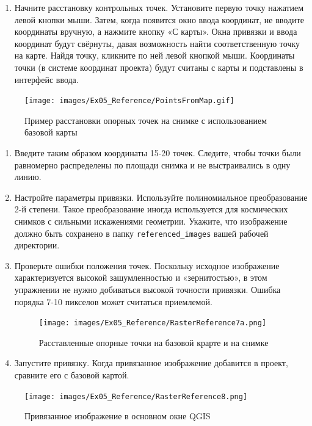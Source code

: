 \documentclass[
  12pt,
]{book}
\providecommand{\tightlist}{%
  \setlength{\itemsep}{0pt}\setlength{\parskip}{0pt}}
\begin{document}
\begin{enumerate}
\def\labelenumi{\arabic{enumi}.}
\setcounter{enumi}{5}
\tightlist
\item
  Начните расстановку контрольных точек. Установите первую точку нажатием левой кнопки мыши. Затем, когда появится окно ввода координат, не вводите координаты вручную, а нажмите кнопку «С карты». Окна привязки и ввода координат будут свёрнуты, давая возможность найти соответственную точку на карте. Найдя точку, кликните по ней левой кнопкой мыши. Координаты точки (в системе координат проекта) будут считаны с карты и подставлены в интерфейс ввода.
\end{enumerate}

\begin{figure}
\centering
\texttt{[image: images/Ex05\_Reference/PointsFromMap.gif]}
\caption{Пример расстановки опорных точек на снимке с использованием базовой карты}
\end{figure}

\begin{enumerate}
\def\labelenumi{\arabic{enumi}.}
\setcounter{enumi}{6}
\item
  Введите таким образом координаты 15-20 точек. Следите, чтобы точки были равномерно распределены по площади снимка и не выстраивались в одну линию.
\item
  Настройте параметры привязки. Используйте полиномиальное преобразование 2-й степени. Такое преобразование иногда используется для космических снимков с сильными искажениями геометрии. Укажите, что изображение должно быть сохранено в папку \texttt{referenced\_images} вашей рабочей директории.
\item
  Проверьте ошибки положения точек. Поскольку исходное изображение характеризуется высокой зашумленностью и «зернитостью», в этом упражнении не нужно добиваться высокой точности привязки. Ошибка порядка 7-10 пикселов может считаться приемлемой.

  \begin{figure}
  \centering
  \texttt{[image: images/Ex05\_Reference/RasterReference7a.png]}
  \caption{Расставленные опорные точки на базовой крарте и на снимке}
  \end{figure}
\item
  Запустите привязку. Когда привязанное изображение добавится в проект, сравните его с базовой картой.
\end{enumerate}

\begin{figure}
\centering
\texttt{[image: images/Ex05\_Reference/RasterReference8.png]}
\caption{Привязанное изображение в основном окне QGIS}
\end{figure}
\end{document}
